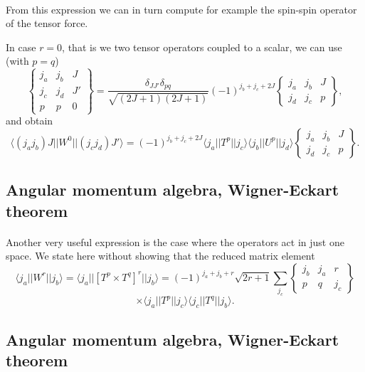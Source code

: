 \documentclass[%
twoside,                 %
final,                   %
10pt]{article}
\begin{document}
\paragraph{}
From this expression we can in turn compute for example the spin-spin operator of the tensor force.


In case $r=0$, that is we two tensor operators coupled to a scalar, we can use (with $p=q$) 
\[
\left\{\begin{array}{ccc} j_a & j_b& J \\ j_c & j_d & J' \\ p &p & 0\end{array}\right\}=\frac{\delta_{JJ'} \delta_{pq}}{\sqrt{(2J+1)(2J+1)}} (-1)^{j_b+j_c+2J} \begin{Bmatrix} j_a & j_b & J\\ j_d & j_c & p \end{Bmatrix},
\]
and obtain
\[
\langle (j_aj_b)J||W^{0}||(j_cj_d)J'\rangle=(-1)^{j_b+j_c+2J}\langle j_a||T^p||j_c\rangle\langle j_b||U^p||j_d\rangle \begin{Bmatrix} j_a & j_b & J\\ j_d & j_c & p \end{Bmatrix}.
\]


\subsection*{Angular momentum algebra, Wigner-Eckart theorem}

\paragraph{}
Another very useful expression is the case where the operators act in just one space. We state here without 
showing that the reduced matrix element
\[
\langle j_a||W^{r}||j_b\rangle=\langle j_a||\left[T^p\times T^q\right]^{r}||j_b\rangle= (-1)^{j_a+j_b+r}\sqrt{2r+1} \sum_{j_c}\begin{Bmatrix} j_b & j_a & r\\ p & q & j_c \end{Bmatrix}
\]
\[
\times \langle j_a||T^p||j_c\rangle \langle j_c||T^q||j_b\rangle.
\]



\subsection*{Angular momentum algebra, Wigner-Eckart theorem}
\end{document}
